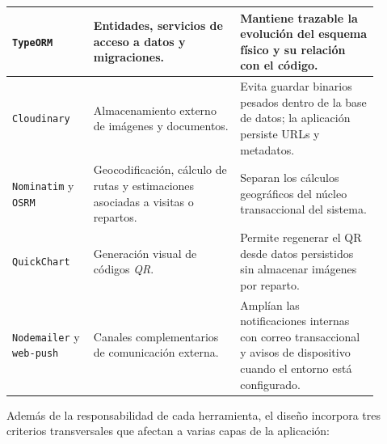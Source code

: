 \begin{table}[H]
{\begin{tabular}{|>{\raggedright\arraybackslash}p{0.20\linewidth}|>{\raggedright\arraybackslash}p{0.36\linewidth}|>{\raggedright\arraybackslash}p{0.34\linewidth}|}
\hline
\texttt{TypeORM} \citep{typeormentities2026,typeormmigrations2026} & Entidades, servicios de acceso a datos y migraciones. & Mantiene trazable la evolución del esquema físico y su relación con el código. \\
\hline
\texttt{Cloudinary} \citep{cloudinaryupload2026,cloudinarypricing2026} & Almacenamiento externo de imágenes y documentos. & Evita guardar binarios pesados dentro de la base de datos; la aplicación persiste URLs y metadatos. \\
\hline
\texttt{Nominatim} y \texttt{OSRM} \citep{nominatimapi2026,osrmdocs2026} & Geocodificación, cálculo de rutas y estimaciones asociadas a visitas o repartos. & Separan los cálculos geográficos del núcleo transaccional del sistema. \\
\hline
\texttt{QuickChart} \citep{quickchartqr2026,quickchartpricing2026} & Generación visual de códigos \textit{QR}. & Permite regenerar el QR desde datos persistidos sin almacenar imágenes por reparto. \\
\hline
\texttt{Nodemailer} y \texttt{web-push} \citep{nodemailersmtp2026,webpushlibs2026} & Canales complementarios de comunicación externa. & Amplían las notificaciones internas con correo transaccional y avisos de dispositivo cuando el entorno está configurado. \\
\hline
\end{tabular}
}
\end{table}

Además de la responsabilidad de cada herramienta, el diseño incorpora tres criterios transversales que afectan a varias capas de la aplicación:

